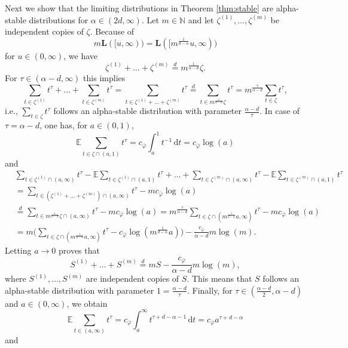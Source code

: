 \documentclass{article}
\theoremstyle{definition}
\numberwithin{equation}{section}
\theoremstyle{remark}
\begin{document}
Next we show that the limiting distributions in Theorem \ref{thm:stable} are alpha-stable distributions for $\alpha\in(2d,\infty)$. Let $m\in\mathbb{N}$ and let $\zeta^{(1)},\ldots,\zeta^{(m)}$ be independent copies of $\zeta$. Because of
$$
m\mathbf{L}([u,\infty)) = \mathbf{L}([m^{\frac{1}{d-\alpha}}u,\infty)) 
$$
for $u\in(0,\infty)$, we have
$$
\zeta^{(1)}+\ldots+\zeta^{(m)}\overset{d}{=}m^{\frac{1}{\alpha-d}}\zeta.
$$
For $\tau\in(\alpha-d,\infty)$ this implies
$$
\sum_{t\in \zeta^{(1)}} t^\tau + \ldots + \sum_{t\in \zeta^{(m)}} t^\tau = \sum_{t\in \zeta^{(1)}+\ldots+\zeta^{(m)}} t^\tau \overset{d}{=} \sum_{t\in m^{\frac{1}{\alpha-d}}\zeta} t^\tau = m^{\frac{\tau}{\alpha-d}} \sum_{t\in \zeta} t^\tau,
$$
i.e., $\sum_{t\in \zeta} t^\tau$ follows an alpha-stable distribution with parameter $\frac{\alpha-d}{\tau}$. In case of $\tau=\alpha-d$, one has, for $a\in(0,1)$,
$$
\mathbb{E}\sum_{t\in\zeta\cap(a,1)} t^{\tau} = c_{\bar\varphi}\int_a^1 t^{-1} \, \mathrm{d}t = c_{\bar\varphi}\log(a)
$$
and
\begin{align*}
& \sum_{t\in \zeta^{(1)}\cap(a,\infty)} t^\tau - \mathbb{E} \sum_{t\in \zeta^{(1)}\cap(a,1)} t^\tau + \ldots + \sum_{t\in \zeta^{(m)}\cap(a,\infty)} t^\tau - \mathbb{E}\sum_{t\in \zeta^{(m)}\cap(a,1)} t^\tau \\
& = \sum_{t\in (\zeta^{(1)}+\ldots+\zeta^{(m)})\cap(a,\infty)} t^\tau - m c_{\bar\varphi}\log(a) \\
& \overset{d}{=} \sum_{t\in m^{\frac{1}{\alpha-d}}\zeta\cap (a,\infty)} t^\tau - m c_{\bar\varphi}\log(a) = m^{\frac{\tau}{\alpha-d}} \sum_{t\in \zeta\cap (m^{\frac{1}{d-\alpha}}a,\infty)} t^\tau - m c_{\bar\varphi}\log(a) \\
& = m \bigg(\sum_{t\in \zeta\cap (m^{\frac{1}{d-\alpha}}a,\infty)} t^\tau - c_{\bar\varphi}\log(m^{\frac{1}{d-\alpha}}a) \bigg) - \frac{c_{\bar\varphi}}{\alpha-d} m \log(m).
\end{align*}
Letting $a\to0$ proves that
$$
S^{(1)}+\ldots+S^{(m)}\overset{d}{=} m S - \frac{c_{\bar\varphi}}{\alpha-d} m \log(m),
$$
where $S^{(1)},\ldots,S^{(m)}$ are independent copies of $S$. This means that $S$ follows an alpha-stable distribution with parameter $1=\frac{\alpha-d}{\tau}$. Finally, for $\tau\in(\frac{\alpha-d}{2},\alpha-d)$ and $a\in(0,\infty)$, we obtain
$$
\mathbb{E}\sum_{t\in(a,\infty)} t^{\tau} = c_{\bar\varphi}\int_a^\infty t^{\tau+d-\alpha-1} \, \mathrm{d}t = c_{\bar\varphi} a^{\tau+d-\alpha}
$$
and
\end{document}
